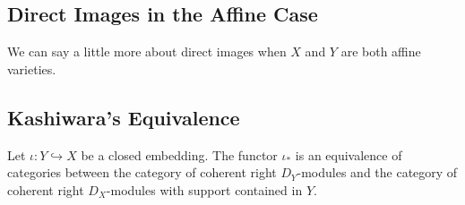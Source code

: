 \subsection{Direct Images in the Affine Case}
We can say a little more about direct images when $X$ and $Y$ are both affine varieties. 

\subsection{Kashiwara's Equivalence}
\begin{thm}\label{thm:kashiwara}
	Let $\iota:Y\hookrightarrow X$ be a closed embedding. The functor $\iota_*$ is an equivalence of categories between the category of coherent right $D_Y$-modules and the category of coherent right $D_X$-modules with support contained in $Y$.
\end{thm}

